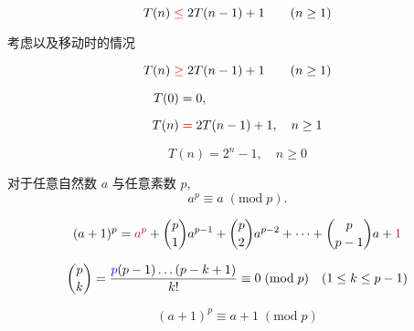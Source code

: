 \begin{frame}{}

  \pause
  \vspace{-0.80cm}
  \[
    T(n) \;\textcolor{red}{\le}\; 2T(n-1) + 1 \qquad (n \ge 1)
  \]
\end{frame}

\begin{frame}{}
  \begin{center}
    考虑以及移动时的情况 \\
    \pause
  \end{center}


  \pause
  \vspace{-0.80cm}
  \[
    T(n) \;\textcolor{red}{\ge}\; 2T(n-1) + 1 \qquad (n \ge 1)
  \]
\end{frame}

\begin{frame}{}
  \begin{align*}
    T(0) &= 0, \\[6pt]
    T(n) &\;\textcolor{red}{=}\; 2T(n-1) + 1, \quad n \ge 1
  \end{align*}

  \pause
  \[
    T(n) = 2^{n} - 1, \quad n \ge 0
  \]
\end{frame}

\begin{frame}{}
  \begin{theorem}
    对于任意自然数 $a$ 与任意素数 $p$,
    \[
      a^{p} \equiv a \;(\mathrm{mod}\; p).
    \]
  \end{theorem}

  \pause
  \vspace{0.30cm}
  \begin{center}
     \pause {}
  \end{center}

  \pause
  \[
    (a+1)^p = \textcolor{purple}{a^p} + \binom{p}{1} a^{p-1} + \binom{p}{2} a^{p-2}
      + \dots + \binom{p}{p-1}a + \textcolor{purple}{1}
  \]

  \pause
  \vspace{0.30cm}
  \[
    \binom{p}{k} = \frac{\textcolor{blue}{p} (p-1) \dots (p-k+1)}{k!} \equiv 0 \;(\mathrm{mod}\; p)
      \quad (1 \le k \le p-1)
  \]

  \pause
  \vspace{0.30cm}
  \[
    (a + 1)^{p} \equiv a + 1\; (\mathrm{mod}\; p)
  \]
\end{frame}

